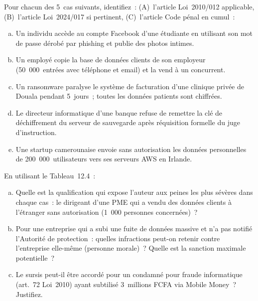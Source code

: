\begin{boxexo}[title={\ding{45}\quad Exercice~12.1. Qualification nationale \niveaubase}]
Pour chacun des 5~cas suivants, identifiez~: (A)~l'article Loi~2010/012
applicable, (B)~l'article Loi~2024/017 si pertinent, (C)~l'article Code
pénal en cumul~:
\begin{enumerate}[(a)]
    \item Un individu accède au compte Facebook d'une étudiante en
          utilisant son mot de passe dérobé par phishing et publie des
          photos intimes.
    \item Un employé copie la base de données clients de son employeur
          (50~000~entrées avec téléphone et email) et la vend à un concurrent.
    \item Un ransomware paralyse le système de facturation d'une clinique
          privée de Douala pendant 5~jours~; toutes les données patients
          sont chiffrées.
    \item Le directeur informatique d'une banque refuse de remettre la
          clé de déchiffrement du serveur de sauvegarde après réquisition
          formelle du juge d'instruction.
    \item Une startup camerounaise envoie sans autorisation les données
          personnelles de 200~000~utilisateurs vers ses serveurs AWS
          en Irlande.
\end{enumerate}
\end{boxexo}

\begin{boxexo}[title={\ding{45}\quad Exercice~12.2. Tableau de sanctions \niveaumoyen}]
En utilisant le Tableau~12.4~:
\begin{enumerate}[(a)]
    \item Quelle est la qualification qui expose l'auteur aux peines les
          plus sévères dans chaque cas~: le dirigeant d'une PME qui a
          vendu des données clients à l'étranger sans autorisation (1~000
          personnes concernées)~?
    \item Pour une entreprise qui a subi une fuite de données massive
          et n'a pas notifié l'Autorité de protection~: quelles infractions
          peut-on retenir contre l'entreprise elle-même (personne morale)~?
          Quelle est la sanction maximale potentielle~?
    \item Le sursis peut-il être accordé pour un condamné pour fraude
          informatique (art.~72 Loi~2010) ayant subtilisé 3~millions FCFA
          via Mobile Money~? Justifiez.
\end{enumerate}
\end{boxexo}

